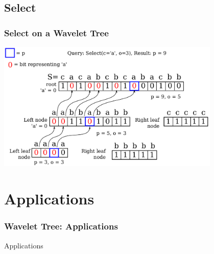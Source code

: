 \documentclass{beamer}
\begin{document}

\subsection{Select}
\begin{frame}
\frametitle{Select on a Wavelet Tree}
\begin{center}
	\includegraphics[width=0.8\textwidth]{SelectDrawing}
\end{center}
\end{frame}

\section{Applications}
\begin{frame}
\frametitle{Wavelet Tree: Applications}
\begin{center} \Huge{Applications} \end{center}
\end{frame}
\end{document}
